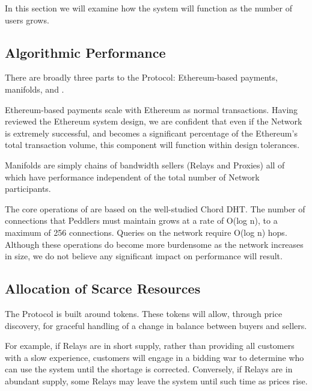 
In this section we will examine how the system will function as the
number of users grows.

\subsection{Algorithmic Performance}

There are broadly three parts to the \Orchid{} Protocol: Ethereum-based
payments, manifolds, and \tOM{}.

Ethereum-based payments scale with Ethereum as normal transactions.
Having reviewed the Ethereum system design, we are confident that even
if the \Orchid{} Network is extremely successful, and becomes a
significant percentage of the Ethereum's total transaction volume,
this component will function within design tolerances.

Manifolds are simply chains of bandwidth sellers (Relays and Proxies)
all of which have performance independent of the total number of
\Orchid{} Network participants.

The core operations of \tOM{} are based on the well-studied Chord
DHT. The number of connections that Peddlers must maintain grows at a
rate of O(log n), to a maximum of 256 connections. Queries on the
network require O(log n) hops. Although these operations do become
more burdensome as the network increases in size, we do not believe
any significant impact on performance will result.

\subsection{Allocation of Scarce Resources}

The \Orchid{} Protocol is built around tokens. These tokens will allow,
through price discovery, for graceful handling of a change in balance
between buyers and sellers.

For example, if Relays are in short supply, rather than providing all
customers with a slow experience, customers will engage in a bidding
war to determine who can use the system until the shortage is
corrected. Conversely, if Relays are in abundant supply, some Relays
may leave the system until such time as prices rise.

